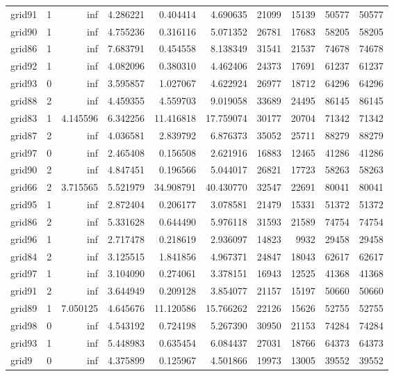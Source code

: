 \begin{longtable}{|l|r|r|r|r|r|r|r|r|r|}
grid91 & 1 & inf & 4.286221 & 0.404414 & 4.690635 & 21099 & 15139 & 50577 & 50577 \\
grid90 & 1 & inf & 4.755236 & 0.316116 & 5.071352 & 26781 & 17683 & 58205 & 58205 \\
grid86 & 1 & inf & 7.683791 & 0.454558 & 8.138349 & 31541 & 21537 & 74678 & 74678 \\
grid92 & 1 & inf & 4.082096 & 0.380310 & 4.462406 & 24373 & 17691 & 61237 & 61237 \\
grid93 & 0 & inf & 3.595857 & 1.027067 & 4.622924 & 26977 & 18712 & 64296 & 64296 \\
grid88 & 2 & inf & 4.459355 & 4.559703 & 9.019058 & 33689 & 24495 & 86145 & 86145 \\
grid83 & 1 & 4.145596 & 6.342256 & 11.416818 & 17.759074 & 30177 & 20704 & 71342 & 71342 \\
grid87 & 2 & inf & 4.036581 & 2.839792 & 6.876373 & 35052 & 25711 & 88279 & 88279 \\
grid97 & 0 & inf & 2.465408 & 0.156508 & 2.621916 & 16883 & 12465 & 41286 & 41286 \\
grid90 & 2 & inf & 4.847451 & 0.196566 & 5.044017 & 26821 & 17723 & 58263 & 58263 \\
grid66 & 2 & 3.715565 & 5.521979 & 34.908791 & 40.430770 & 32547 & 22691 & 80041 & 80041 \\
grid95 & 1 & inf & 2.872404 & 0.206177 & 3.078581 & 21479 & 15331 & 51372 & 51372 \\
grid86 & 2 & inf & 5.331628 & 0.644490 & 5.976118 & 31593 & 21589 & 74754 & 74754 \\
grid96 & 1 & inf & 2.717478 & 0.218619 & 2.936097 & 14823 & 9932 & 29458 & 29458 \\
grid84 & 2 & inf & 3.125515 & 1.841856 & 4.967371 & 24847 & 18043 & 62617 & 62617 \\
grid97 & 1 & inf & 3.104090 & 0.274061 & 3.378151 & 16943 & 12525 & 41368 & 41368 \\
grid91 & 2 & inf & 3.644949 & 0.209128 & 3.854077 & 21157 & 15197 & 50660 & 50660 \\
grid89 & 1 & 7.050125 & 4.645676 & 11.120586 & 15.766262 & 22126 & 15626 & 52755 & 52755 \\
grid98 & 0 & inf & 4.543192 & 0.724198 & 5.267390 & 30950 & 21153 & 74284 & 74284 \\
grid93 & 1 & inf & 5.448983 & 0.635454 & 6.084437 & 27031 & 18766 & 64373 & 64373 \\
grid9 & 0 & inf & 4.375899 & 0.125967 & 4.501866 & 19973 & 13005 & 39552 & 39552 \\

\end{longtable}
